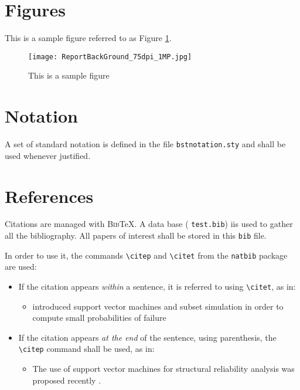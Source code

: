 \documentclass{rsuqreport}
\begin{document}
\section{Figures}
This is a sample figure referred to as Figure \ref{img: test figure}.
\begin{figure}[h!]
	\centering
	\texttt{[image: ReportBackGround\_75dpi\_1MP.jpg]}
	\caption{This is a sample figure}
	\label{img: test figure}
\end{figure}


\section{Notation}
A set of standard notation is defined in the file \verb|bstnotation.sty| and shall be 
used 
whenever justified.

\section{References}
Citations are managed with \textsc{Bib}\TeX. A data base (\eg{} \verb|test.bib|) iis 
used to gather 
all the bibliography. All papers of interest shall be stored in this \verb|bib| file.

In order to use it, the commands \verb|\citep| and \verb|\citet| from the 
\verb|natbib| package are 
used:
\begin{itemize}
\item If the citation appears \emph{within} a sentence, it is referred to using 
\verb|\citet|, as 
in:  
	\begin{itemize}
		\item[] \citet{Bourinet2011} introduced support vector machines and subset 
		simulation in 
		order to compute small probabilities of failure
	\end{itemize}
\item If the citation appears \emph{at the end} of the sentence, \ie{} using 
parenthesis, the 
\verb|\citep| command shall be used, as in:\\
\begin{itemize}
	\item[] The use of support vector machines for structural reliability analysis was 
	proposed 
		recently \citep{Bourinet2011,Basudhar2008a,Basudhar2008b}.
\end{itemize}
\end{itemize}



\end{document}
